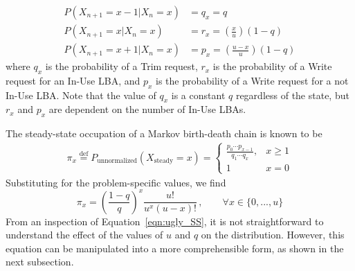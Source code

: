\documentclass[prodmode,acmtos]{acmsmall}
\begin{document}
\begin{align*}
P(X_{n+1}=x-1|X_n=x) &= q_x = q\\
P(X_{n+1}=x|X_n=x) &= r_x = \left( \frac{x}{u} \right)\left( 1 - q \right)\\
P(X_{n+1}=x+1|X_n=x) &= p_x = \left( \frac{u - x}{u} \right) \left( 1 - q \right)
\end{align*}
where $q_x$ is the probability of a Trim request, $r_x$ is the probability of a Write request for an In-Use LBA, and $p_x$ is the probability of a Write request for a not In-Use LBA.  Note that the value of $q_x$ is a constant $q$ regardless of the state, but $r_x$ and $p_x$ are dependent on the number of In-Use LBAs.

The steady-state occupation of a Markov birth-death chain is known to be~\cite{hoel1971}
\begin{align*}
  \pi _x \stackrel{\text{def}}{=} P_\text{unnormalized}(X_\text{steady}=x) = \begin{cases}
  \frac{p_0 \cdots p_{x - 1}}{q_1 \cdots q_x}, & x \geqslant 1 \\
  1 & x = 0
  \end{cases}
\end{align*}
Substituting for the problem-specific values, we find
\begin{equation}\label{eqn:ugly_SS}
\pi _x = \left( \frac{1 - q}{q} \right)^x\frac{u!}{u^x\left( u - x \right)!} \, , \qquad \forall x \in \{ 0,...,u\}
\end{equation}
From an inspection of Equation~\ref{eqn:ugly_SS}, it is not straightforward to understand the effect of the values of $u$ and $q$ on the distribution.  However, this equation can be manipulated into a more comprehensible form, as shown in the next subsection.
\end{document}
